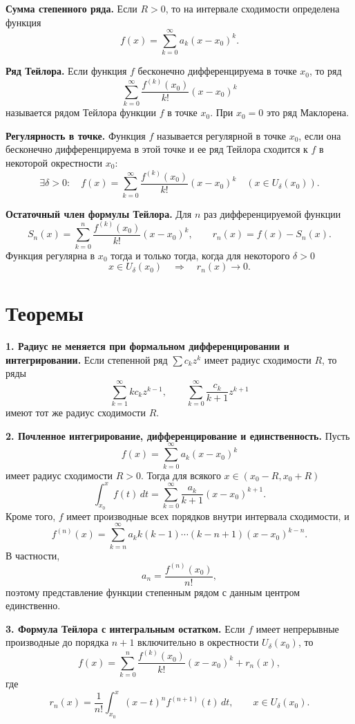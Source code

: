 \documentclass[12pt,a4paper]{article}
\newcommand{\dd}{\,d}
\begin{document}
\textbf{Сумма степенного ряда.}
Если \(R>0\), то на интервале сходимости определена функция
\[
  f(x)=\sum_{k=0}^{\infty}a_k(x-x_0)^k.
\]

\textbf{Ряд Тейлора.}
Если функция \(f\) бесконечно дифференцируема в точке \(x_0\), то ряд
\[
  \sum_{k=0}^{\infty}\frac{f^{(k)}(x_0)}{k!}(x-x_0)^k
\]
называется рядом Тейлора функции \(f\) в точке \(x_0\). При \(x_0=0\) это
ряд Маклорена.

\textbf{Регулярность в точке.}
Функция \(f\) называется регулярной в точке \(x_0\), если она бесконечно
дифференцируема в этой точке и ее ряд Тейлора сходится к \(f\) в некоторой
окрестности \(x_0\):
\[
  \exists\delta>0:\quad
  f(x)=\sum_{k=0}^{\infty}\frac{f^{(k)}(x_0)}{k!}(x-x_0)^k
  \quad (x\in U_\delta(x_0)).
\]

\textbf{Остаточный член формулы Тейлора.}
Для \(n\) раз дифференцируемой функции
\[
  S_n(x)=\sum_{k=0}^{n}\frac{f^{(k)}(x_0)}{k!}(x-x_0)^k,\qquad
  r_n(x)=f(x)-S_n(x).
\]
Функция регулярна в \(x_0\) тогда и только тогда, когда для некоторого
\(\delta>0\)
\[
  x\in U_\delta(x_0)\quad\Longrightarrow\quad r_n(x)\to0.
\]

\section*{Теоремы}

\textbf{1. Радиус не меняется при формальном дифференцировании и
интегрировании.}
Если степенной ряд \(\sum c_kz^k\) имеет радиус сходимости \(R\), то ряды
\[
  \sum_{k=1}^{\infty}kc_kz^{k-1},
  \qquad
  \sum_{k=0}^{\infty}\frac{c_k}{k+1}z^{k+1}
\]
имеют тот же радиус сходимости \(R\).

\textbf{2. Почленное интегрирование, дифференцирование и единственность.}
Пусть
\[
  f(x)=\sum_{k=0}^{\infty}a_k(x-x_0)^k
\]
имеет радиус сходимости \(R>0\). Тогда для всякого
\(x\in(x_0-R,x_0+R)\)
\[
  \int_{x_0}^{x} f(t)\dd t
  =
  \sum_{k=0}^{\infty}\frac{a_k}{k+1}(x-x_0)^{k+1}.
\]
Кроме того, \(f\) имеет производные всех порядков внутри интервала сходимости,
и
\[
  f^{(n)}(x)
  =
  \sum_{k=n}^{\infty}
  a_k k(k-1)\cdots(k-n+1)(x-x_0)^{k-n}.
\]
В частности,
\[
  a_n=\frac{f^{(n)}(x_0)}{n!},
\]
поэтому представление функции степенным рядом с данным центром единственно.

\textbf{3. Формула Тейлора с интегральным остатком.}
Если \(f\) имеет непрерывные производные до порядка \(n+1\) включительно в
окрестности \(U_\delta(x_0)\), то
\[
  f(x)=\sum_{k=0}^{n}\frac{f^{(k)}(x_0)}{k!}(x-x_0)^k+r_n(x),
\]
где
\[
  r_n(x)=\frac1{n!}\int_{x_0}^{x}(x-t)^n f^{(n+1)}(t)\dd t,
  \qquad x\in U_\delta(x_0).
\]
\end{document}
